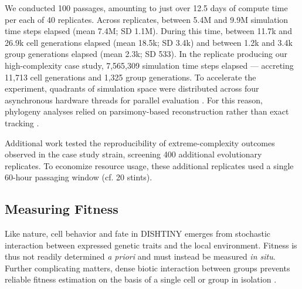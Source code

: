 
%

We conducted 100 passages, amounting to just over 12.5 days of compute time per each of 40 replicates.
Across replicates, between 5.4M and 9.9M simulation time steps elapsed (mean 7.4M; SD 1.1M).
During this time, between 11.7k and 26.9k cell generations elapsed (mean 18.5k; SD 3.4k) and between 1.2k and 3.4k group generations elapsed (mean 2.3k; SD 533).
In the replicate producing our high-complexity case study, 7,565,309 simulation time steps elapsed --- accreting 11,713 cell generations and 1,325 group generations.
To accelerate the experiment, quadrants of simulation space were distributed across four asynchronous hardware threads for parallel evaluation \citep{moreno2021conduit}.
For this reason, phylogeny analyses relied on parsimony-based reconstruction rather than exact tracking \citep{moreno2022hereditary}.

Additional work tested the reproducibility of extreme-complexity outcomes observed in the case study strain, screening 400 additional evolutionary replicates.
To economize resource usage, these additional replicates used a single 60-hour passaging window (cf. 20 stints).

\subsection{Measuring Fitness}
\label{sec:measuringfitness}



Like nature, cell behavior and fate in DISHTINY emerges from stochastic interaction between expressed genetic traits and the local environment.
Fitness is thus not readily determined \textit{a priori} \citep{franklin2019mapping} and must instead be measured \textit{in situ}.
Further complicating matters, dense biotic interaction between groups prevents reliable fitness estimation on the basis of a single cell or group in isolation \citep{wadgymar2024defining}.

